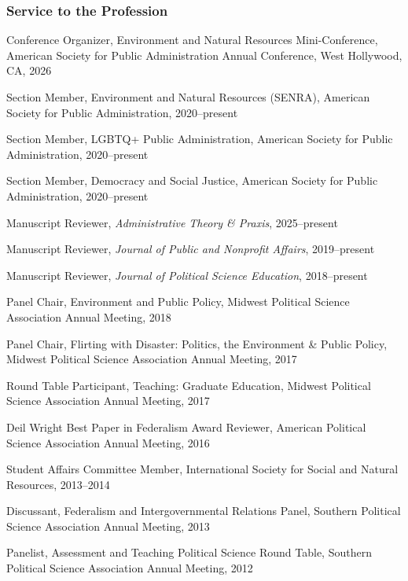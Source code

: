 \documentclass[12pt,letterpaper]{article}
\renewenvironment{itemize}{
  \begin{list}{}{
    \setlength{\leftmargin}{1.5em}
    \setlength{\itemsep}{0.25em}
    \setlength{\parskip}{0pt}
    \setlength{\parsep}{0.25em}
  }
}{
  \end{list}
}
\begin{document}
\subsubsection*{Service to the Profession}
\begin{itemize}\leftmargin=2pt\itemindent=-15pt
    \item Conference Organizer, Environment and Natural Resources Mini-Conference, American Society for Public Administration Annual Conference, West Hollywood, CA, 2026
    \item Section Member, Environment and Natural Resources (SENRA), American Society for Public Administration, 2020--present
    \item Section Member, LGBTQ+ Public Administration, American Society for Public Administration, 2020--present
    \item Section Member, Democracy and Social Justice, American Society for Public Administration, 2020--present
    \item Manuscript Reviewer, \emph{Administrative Theory \& Praxis}, 2025--present
    \item Manuscript Reviewer, \emph{Journal of Public and Nonprofit Affairs}, 2019--present
    \item Manuscript Reviewer, \emph{Journal of Political Science Education}, 2018--present
    \item Panel Chair, Environment and Public Policy, Midwest Political Science Association Annual Meeting, 2018
    \item Panel Chair, Flirting with Disaster: Politics, the Environment \& Public Policy, Midwest Political Science Association Annual Meeting, 2017
    \item Round Table Participant, Teaching: Graduate Education, Midwest Political Science Association Annual Meeting, 2017
    \item Deil Wright Best Paper in Federalism Award Reviewer, American Political Science Association Annual Meeting, 2016
    \item Student Affairs Committee Member, International Society for Social and Natural Resources, 2013--2014
    \item Discussant, Federalism and Intergovernmental Relations Panel, Southern Political Science Association Annual Meeting, 2013
    \item Panelist, Assessment and Teaching Political Science Round Table, Southern Political Science Association Annual Meeting, 2012
\end{itemize}
\end{document}
